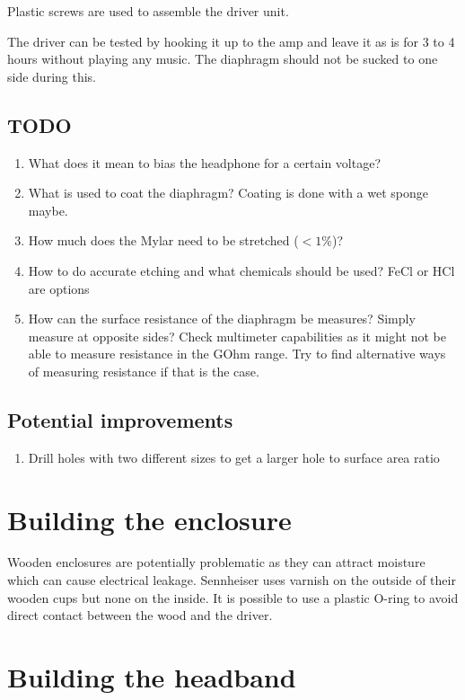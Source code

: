 \documentclass{article}
\begin{document}
Plastic screws are used to assemble the driver unit.

The driver can be tested by hooking it up to the amp and leave it as is for 3 to 4 hours without playing any music. The diaphragm should not be sucked to one side during this.

\subsection{TODO}
\begin{enumerate}
    \item What does it mean to bias the headphone for a certain voltage?
    \item What is used to coat the diaphragm? Coating is done with a wet sponge maybe.
    \item How much does the Mylar need to be stretched ($< 1\%$)?
    \item How to do accurate etching and what chemicals should be used? FeCl or HCl are options
    \item How can the surface resistance of the diaphragm be measures? Simply measure at opposite sides? Check multimeter capabilities as it might not be able to measure resistance in the GOhm range. Try to find alternative ways of measuring resistance if that is the case.
\end{enumerate}

\subsection{Potential improvements}
\begin{enumerate}
    \item Drill holes with two different sizes to get a larger hole to surface area ratio
\end{enumerate}

\section{Building the enclosure}
\label{s:enclosure}
Wooden enclosures are potentially problematic as they can attract moisture which can cause electrical leakage. Sennheiser uses varnish on the outside of their wooden cups but none on the inside. It is possible to use a plastic O-ring to avoid direct contact between the wood and the driver.

\section{Building the headband}
\label{s:headband}
\end{document}
